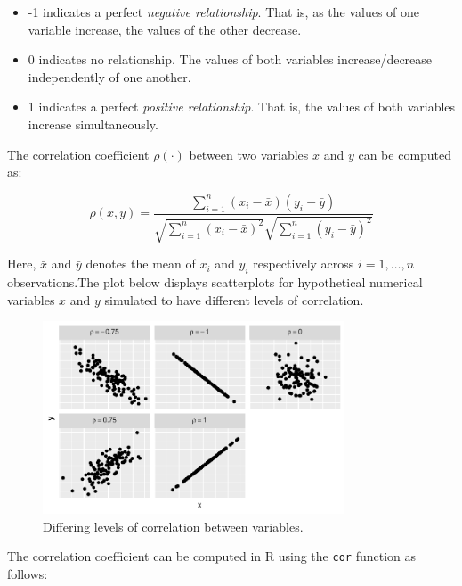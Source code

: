 \documentclass[
  letterpaper,
  DIV=11,
  numbers=noendperiod]{scrartcl}
\newenvironment{Shaded}{\begin{snugshade}}{\end{snugshade}}
\newcommand{\FunctionTok}[1]{\textcolor[rgb]{0.28,0.35,0.67}{#1}}
\newcommand{\NormalTok}[1]{\textcolor[rgb]{0.00,0.23,0.31}{#1}}
\newcommand{\SpecialCharTok}[1]{\textcolor[rgb]{0.37,0.37,0.37}{#1}}
\providecommand{\tightlist}{%
  \setlength{\itemsep}{0pt}\setlength{\parskip}{0pt}}\usepackage{longtable,booktabs,array}
\begin{document}
\begin{itemize}
\tightlist
\item
  -1 indicates a perfect \emph{negative relationship}. That is, as the
  values of one variable increase, the values of the other decrease.
\item
  0 indicates no relationship. The values of both variables
  increase/decrease independently of one another.
\item
  1 indicates a perfect \emph{positive relationship}. That is, the
  values of both variables increase simultaneously.
\end{itemize}

The correlation coefficient \(\rho(\cdot)\) between two variables \(x\)
and \(y\) can be computed as:

\[
\rho (x,y) = \dfrac{\sum_{i=1}^n (x_i -\bar{x})(y_i-\bar{y})}{\sqrt{\sum_{i=1}^n (x_i-\bar{x})^2}\sqrt{\sum_{i=1}^n (y_i-\bar{y})^2}}
\]

Here, \(\bar{x}\) and \(\bar{y}\) denotes the mean of \(x_i\) and
\(y_i\) respectively across \(i= 1,\ldots,n\) observations.The plot
below displays scatterplots for hypothetical numerical variables \(x\)
and \(y\) simulated to have different levels of correlation.

\begin{figure}[H]

{\centering \includegraphics[width=0.8\textwidth,height=\textheight]{index_files/figure-pdf/correlation2-1.pdf}

}

\caption{Differing levels of correlation between variables.}

\end{figure}%

The correlation coefficient can be computed in R using the \texttt{cor}
function as follows:

\begin{Shaded}
\end{Shaded}
\end{document}
